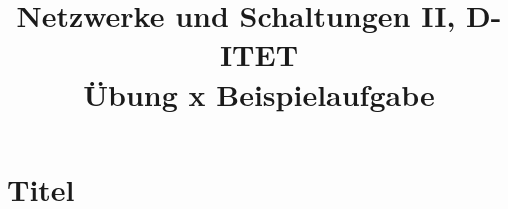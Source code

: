 \documentclass[11pt,a4paper]{article}
\title{\textbf{Netzwerke und Schaltungen II, D-ITET}\\[0.5cm]
       \textbf{\Huge Übung x Beispielaufgabe}\\[0.5cm]
}
\date{} %
\begin{document}
\maketitle

\section{Titel}
\end{document}
